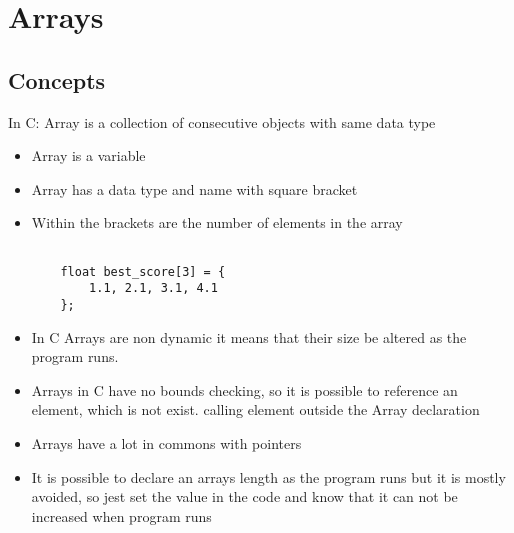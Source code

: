 \section{Arrays}
\subsection{Concepts}

In C: Array is a collection of consecutive objects with same data type
\begin{itemize}
    \item Array is a variable
    \item Array has a data type and name with square bracket
    \item Within the brackets are the number of elements in the array


    \begin{lstlisting}
        
    float best_score[3] = {
        1.1, 2.1, 3.1, 4.1
    };

    \end{lstlisting}

    \item In C Arrays are non dynamic it means that their size be altered as the program runs.
    \item Arrays in C have no bounds checking, so it is possible to reference an element, which is not exist. calling element outside the Array declaration
    \item Arrays have a lot in commons with pointers
    \item It is possible to declare an arrays length as the program runs but it is mostly avoided, so jest set the value in the code and know that it can not be increased when program runs
    \end{itemize}
    \break
    \break
    
